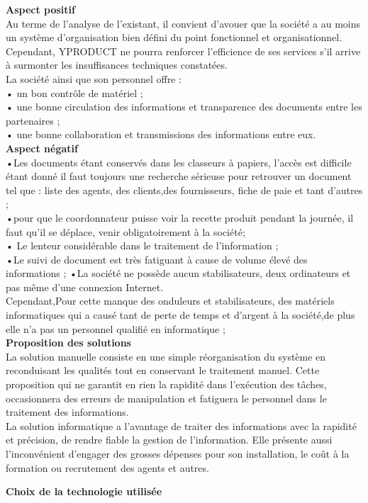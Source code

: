 \documentclass[12pt, openany]{report}
\begin{document}
\textbf{Aspect positif}\\
Au terme de l'analyse de l'existant, il convient d'avouer que la société a au moins un système d'organisation bien défini du point fonctionnel et organisationnel. Cependant, YPRODUCT ne pourra renforcer l'efficience de ses services s'il arrive à surmonter les insuffisances techniques constatées.\\
La société ainsi que son personnel offre : \\
• un bon contrôle de matériel ;\\
• une bonne circulation des informations et transparence des documents entre les partenaires ;\\
• une bonne collaboration et transmissions des informations entre eux.\\
\textbf{Aspect négatif}\\
•Les documents étant conservés dans les classeurs à papiers, l'accès est difficile étant donné il faut toujours une recherche sérieuse pour retrouver un document tel que : liste des agents, des clients,des fournisseurs, fiche de paie et tant d'autres ;\\
•pour que le coordonnateur puisse voir la recette produit pendant la journée, il faut qu'il se déplace, venir obligatoirement à la société;\\
• Le lenteur considérable dans le traitement de l'information ;\\
•Le suivi de document est très fatiguant à cause de volume élevé des informations ;
•La société ne possède aucun stabilisateurs, deux ordinateurs et pas même d'une connexion Internet.\\
Cependant,Pour cette manque des onduleurs et stabilisateurs, des matériels informatiques qui a causé tant de perte de temps et d’argent à la société,de plus elle n'a pas un personnel qualifié en informatique ;\\
\textbf{Proposition des solutions}\\
La solution manuelle consiste en une simple réorganisation du système en reconduisant les qualités tout en conservant le traitement manuel. Cette proposition qui ne garantit en rien la rapidité dans l'exécution des tâches, occasionnera des erreurs de manipulation et fatiguera le personnel dans le traitement des informations.\\
La solution informatique a l'avantage de traiter des informations avec la rapidité et précision, de rendre fiable la gestion de l'information. Elle présente aussi l'inconvénient d'engager des grosses dépenses pour son installation, le coût à la formation ou recrutement des agents et autres.\\
\newpage
\begin{center}
\textbf{Choix de la technologie utilisée }\\
\end{center}
\end{document}
